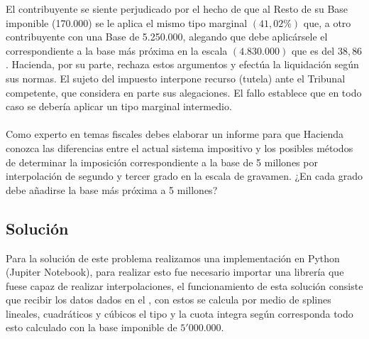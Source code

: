 \documentclass[10pt,letterpaper]{article}
\begin{document}
	El contribuyente se siente perjudicado por el hecho de que al Resto de su Base imponible (170.000) se le aplica el mismo tipo marginal $(41,02\%)$ que, a otro contribuyente con una Base de 5.250.000, alegando que debe aplicársele el correspondiente a la base más próxima en la escala $(4.830.000)$ que es del $38,86$. Hacienda, por su parte, rechaza estos argumentos y efectúa la liquidación según sus normas. El sujeto del impuesto interpone recurso (tutela) ante el Tribunal competente, que considera en parte sus alegaciones. El fallo establece que en todo caso se debería aplicar un tipo marginal intermedio.\\\\
	Como experto en temas fiscales debes elaborar un informe para que Hacienda conozca las diferencias entre el actual sistema impositivo y los posibles métodos de determinar la imposición correspondiente a la base de 5 millones por interpolación de segundo y tercer grado en la escala de gravamen. ¿En cada grado debe añadirse la base más próxima a 5 millones?	
	\subsection{Solución}
	Para la solución de este problema realizamos una implementación en Python (Jupiter Notebook), para realizar esto fue necesario importar una librería que fuese capaz de realizar interpolaciones, el funcionamiento de esta solución consiste que recibir los datos dados en el , con estos se calcula por medio de splines lineales, cuadráticos y cúbicos el tipo y la cuota integra según corresponda todo esto calculado con la base imponible de $5'000.000$.\\
	
\end{document}
